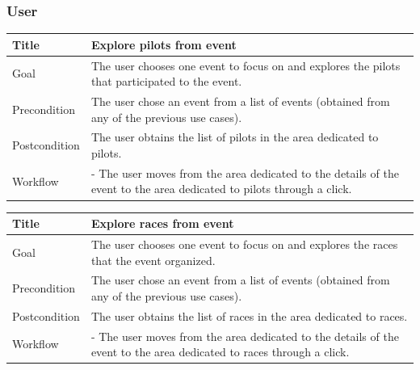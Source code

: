 \documentclass{beamer}
\begin{document}
\begin{frame}
    \frametitle{User}
    \begin{table}
        \tiny
        \begin{tabular}{|p{2cm}|p{6cm}|}
        \hline  
        Title & \textbf{Explore pilots from event} \\
        \hline
        Goal & The user chooses one event to focus on and explores the pilots that participated to the event. \\
        \hline
        Precondition & The user chose an event from a list of events (obtained from any of the previous use cases).\\
        \hline
        Postcondition & The user obtains the list of pilots in the area dedicated to pilots. \\
        \hline
        Workflow &
        - The user moves from the area dedicated to the details of the event to the
        area dedicated to pilots through a click. \\
        \hline
        \end{tabular}
\end{table}

\begin{table}
    \tiny
    \begin{tabular}{|p{2cm}|p{6cm}|}
    \hline  
    Title & \textbf{Explore races from event} \\
    \hline
    Goal & The user chooses one event to focus on and
    explores the races that the event organized. \\
    \hline
    Precondition & The user chose an event from a list of events (obtained from any of the previous use cases).\\
    \hline
    Postcondition & The user obtains
    the list of races in the area dedicated to races. \\
    \hline
    Workflow &
    - The user moves from the area dedicated to the details of the event to the
    area dedicated to races through a click. \\
    \hline
    \end{tabular}
\end{table}
\end{frame}


\end{document}
